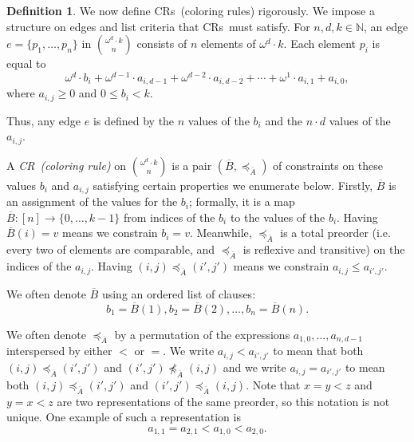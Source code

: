 \documentclass[10pt,a4paper]{article}
\newcommand{\om}{\omega}
\newcommand{\N}{\mathbb{N}}
\newcommand{\crulenospace}{CR}
\newcommand{\cruleLong}{coloring rule}
\newcommand{\crulesLong}{coloring rules}
\newcommand{\crule}{\crulenospace~}
\newcommand{\crules}{\crulenospace s~}
\newcommand{\xleq}{\preceq_{\overline{A}}}
\newcommand{\assny}{\overline{B}}
\newcommand{\numpoints}{n}
\newcommand{\inumpoints}{i}
\newcommand{\idegr}{j}
\newcommand{\commonconst}{a}
\newcommand{\rareconst}{b}
\theoremstyle{plain}
\theoremstyle{definition}
\newtheorem{definition}[theorem]{Definition}
\begin{document}
\begin{definition}\label{def:coloring-rule}
We now define \crules (\crulesLong) rigorously. We impose a structure on edges and list criteria that \crules must satisfy.
For $\numpoints,d,k \in \N$, an edge $e = \{p_1, \dots, p_{\numpoints}\}$ in $\binom{\om^d \cdot k}{\numpoints}$ consists of $\numpoints$ elements of $\om^d\cdot k$. Each element $p_{\inumpoints} $ is equal to 
$$\om^d \cdot \rareconst_{\inumpoints} + \om^{d-1} \cdot \commonconst_{\inumpoints,d-1} + \om^{d-2} \cdot \commonconst_{\inumpoints,d-2} + \cdots + \om^1 \cdot \commonconst_{\inumpoints,1} + \commonconst_{\inumpoints,0},$$
where $\commonconst_{\inumpoints,\idegr} \geq 0$ and $0\leq \rareconst_{\inumpoints} < k$.

Thus, any edge $e$ is defined by the $\numpoints$ values of the $\rareconst_{\inumpoints}$ and the $\numpoints\cdot d$ values of the $\commonconst_{\inumpoints,\idegr}$. 

A \textit{\crule (\cruleLong)} on $\binom{\om^d \cdot k}{\numpoints}$ is a pair $(\assny,\xleq)$ of constraints on these values $\rareconst_{\inumpoints}$ and $\commonconst_{\inumpoints,\idegr}$ satisfying certain properties we enumerate below. Firstly, $\assny$ is an assignment of the values for the $\rareconst_{\inumpoints}$; formally, it is a map $\assny: [\numpoints] \to \{0,\dots,k-1\}$ from indices of the $\rareconst_{\inumpoints}$ to the values of the $\rareconst_{\inumpoints}$. Having $\assny(\inumpoints) = v$ means we constrain $\rareconst_{\inumpoints} = v$.
Meanwhile, $\xleq$ is a total preorder (i.e. every two of elements are comparable, and $\xleq$ is reflexive and transitive) on the indices of the $\commonconst_{\inumpoints,\idegr}$. Having $(\inumpoints,\idegr) \xleq (\inumpoints',\idegr')$ means we constrain $\commonconst_{\inumpoints,\idegr} \leq \commonconst_{\inumpoints',\idegr'}$.

We often denote $\assny$ using an ordered list of clauses: $$\rareconst_1 = \assny(1), \rareconst_2 = \assny(2), \dots, \rareconst_{\numpoints} = \assny(\numpoints).$$

We often denote $\xleq$ by a permutation of the expressions $\commonconst_{1,0}, \dots, \commonconst_{\numpoints,d-1}$ interspersed by either $<$ or $=$. We write $\commonconst_{\inumpoints,\idegr} < \commonconst_{\inumpoints',\idegr'}$ to mean that both $(\inumpoints,\idegr) 
\xleq (\inumpoints',\idegr')$ and $(\inumpoints',\idegr') 
\not \xleq (\inumpoints,\idegr)$ and we write $\commonconst_{\inumpoints,\idegr} = \commonconst_{\inumpoints',\idegr'}$ to mean both $(\inumpoints,\idegr) 
\xleq (\inumpoints',\idegr')$ and $(\inumpoints',\idegr') 
\xleq (\inumpoints,\idegr)$. Note that $x = y < z$ and $y = x < z$ are two representations of the same preorder, so this notation is not unique. One example of such a representation is $$
\commonconst_{1, 1} = \commonconst_{2, 1} < \commonconst_{1 ,0} < \commonconst_{2 ,0}.
$$


\end{definition}
\end{document}
